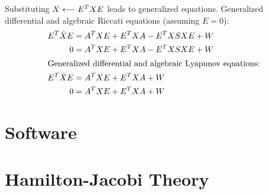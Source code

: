 Substituting $X\longleftarrow E^T XE$ leads to generalized equations.
Generalized differential and algebraic Riccati equations (assuming $\dot E = 0$):
\begin{align}
  E^T \dot{X}E &= A^T XE + E^T XA - E^T XSXE + W \\
  0 &= A^T XE + E^T XA - E^T XSXE + W \\
\intertext{Generalized differential and algebraic Lyapunov equations:}
  E^T \dot{X}E &= A^T XE + E^T XA + W \\
  0 &= A^T XE + E^T XA + W \\
\end{align}

\cite{Lang2017}

\section{Software}

\cite{DrWatson}
\cite{Makie}

\section{Hamilton-Jacobi Theory}

